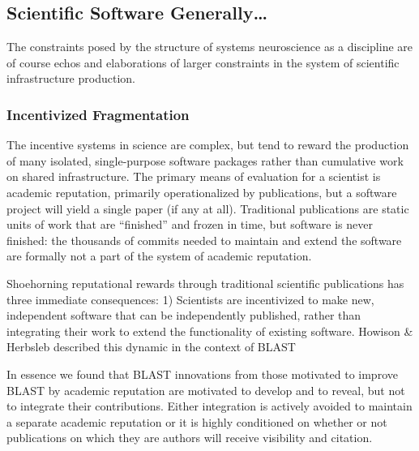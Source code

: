 \documentclass[11pt]{article}
\begin{document}
\begin{multicols}{2}
\end{multicols}


\hypertarget{scientific-software-generally}{%
\subsection{Scientific Software
Generally\ldots{}}\label{scientific-software-generally}}


\begin{multicols}{2}
 The constraints posed by the structure of systems
neuroscience as a discipline are of course echos and elaborations of
larger constraints in the system of scientific infrastructure
production.

\hypertarget{incentivized-fragmentation}{%
\subsubsection{Incentivized
Fragmentation}\label{incentivized-fragmentation}}

The incentive systems in science are complex, but tend to reward the
production of many isolated, single-purpose software packages rather
than cumulative work on shared infrastructure. The primary means of
evaluation for a scientist is academic reputation, primarily
operationalized by publications, but a software project will yield a
single paper (if any at all). Traditional publications are static units
of work that are ``finished'' and frozen in time, but software is never
finished: the thousands of commits needed to maintain and extend the
software are formally not a part of the system of academic reputation.

Shoehorning reputational rewards through traditional scientific
publications has three immediate consequences: 1) Scientists are
incentivized to make new, independent software that can be independently
published, rather than integrating their work to extend the
functionality of existing software. Howison \& Herbsleb described this
dynamic in the context of BLAST

\begin{leftbar}
In essence we found that BLAST innovations from those motivated to
improve BLAST by academic reputation are motivated to develop and to
reveal, but not to integrate their contributions. Either integration is
actively avoided to maintain a separate academic reputation or it is
highly conditioned on whether or not publications on which they are
authors will receive visibility and citation. \cite{howisonIncentivesIntegrationScientific2013} 
\end{leftbar}


\end{multicols}
\end{document}

